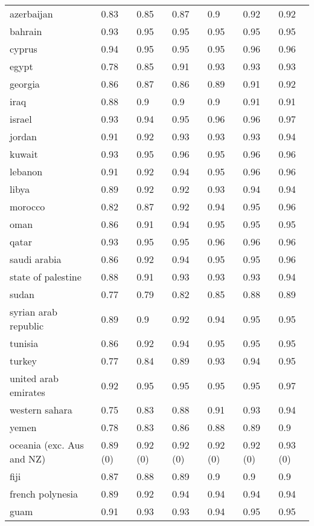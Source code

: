 \begin{longtable}[t]{lllllll}
azerbaijan & 0.83 & 0.85 & 0.87 & 0.9 & 0.92 & 0.92\\
bahrain & 0.93 & 0.95 & 0.95 & 0.95 & 0.95 & 0.95\\
\addlinespace
cyprus & 0.94 & 0.95 & 0.95 & 0.95 & 0.96 & 0.96\\
egypt & 0.78 & 0.85 & 0.91 & 0.93 & 0.93 & 0.93\\
georgia & 0.86 & 0.87 & 0.86 & 0.89 & 0.91 & 0.92\\
iraq & 0.88 & 0.9 & 0.9 & 0.9 & 0.91 & 0.91\\
israel & 0.93 & 0.94 & 0.95 & 0.96 & 0.96 & 0.97\\
\addlinespace
jordan & 0.91 & 0.92 & 0.93 & 0.93 & 0.93 & 0.94\\
kuwait & 0.93 & 0.95 & 0.96 & 0.95 & 0.96 & 0.96\\
lebanon & 0.91 & 0.92 & 0.94 & 0.95 & 0.96 & 0.96\\
libya & 0.89 & 0.92 & 0.92 & 0.93 & 0.94 & 0.94\\
morocco & 0.82 & 0.87 & 0.92 & 0.94 & 0.95 & 0.96\\
\addlinespace
oman & 0.86 & 0.91 & 0.94 & 0.95 & 0.95 & 0.95\\
qatar & 0.93 & 0.95 & 0.95 & 0.96 & 0.96 & 0.96\\
saudi arabia & 0.86 & 0.92 & 0.94 & 0.95 & 0.95 & 0.96\\
state of palestine & 0.88 & 0.91 & 0.93 & 0.93 & 0.93 & 0.94\\
sudan & 0.77 & 0.79 & 0.82 & 0.85 & 0.88 & 0.89\\
\addlinespace
syrian arab republic & 0.89 & 0.9 & 0.92 & 0.94 & 0.95 & 0.95\\
tunisia & 0.86 & 0.92 & 0.94 & 0.95 & 0.95 & 0.95\\
turkey & 0.77 & 0.84 & 0.89 & 0.93 & 0.94 & 0.95\\
united arab emirates & 0.92 & 0.95 & 0.95 & 0.95 & 0.95 & 0.97\\
western sahara & 0.75 & 0.83 & 0.88 & 0.91 & 0.93 & 0.94\\
\addlinespace
yemen & 0.78 & 0.83 & 0.86 & 0.88 & 0.89 & 0.9\\
oceania (exc. Aus and NZ) & 0.89 (0) & 0.92 (0) & 0.92 (0) & 0.92 (0) & 0.92 (0) & 0.93 (0)\\
fiji & 0.87 & 0.88 & 0.89 & 0.9 & 0.9 & 0.9\\
french polynesia & 0.89 & 0.92 & 0.94 & 0.94 & 0.94 & 0.94\\
guam & 0.91 & 0.93 & 0.93 & 0.94 & 0.95 & 0.95\\

\end{longtable}
